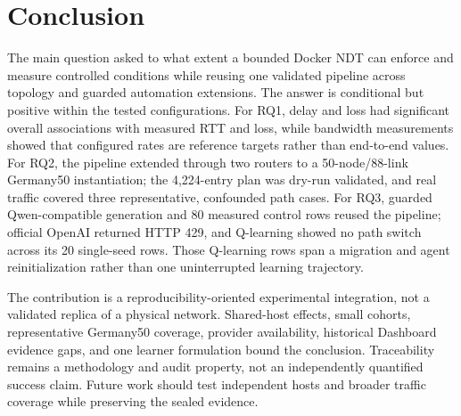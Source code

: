 \section{Conclusion}
\label{sec:conclusion}

The main question asked to what extent a bounded Docker NDT can enforce and measure controlled conditions while reusing one validated pipeline across topology and guarded automation extensions. The answer is conditional but positive within the tested configurations. For RQ1, delay and loss had significant overall associations with measured RTT and loss, while bandwidth measurements showed that configured rates are reference targets rather than end-to-end values. For RQ2, the pipeline extended through two routers to a 50-node/88-link Germany50 instantiation; the 4,224-entry plan was dry-run validated, and real traffic covered three representative, confounded path cases. For RQ3, guarded Qwen-compatible generation and 80 measured control rows reused the pipeline; official OpenAI returned HTTP 429, and Q-learning showed no path switch across its 20 single-seed rows. Those Q-learning rows span a migration and agent reinitialization rather than one uninterrupted learning trajectory.

The contribution is a reproducibility-oriented experimental integration, not a validated replica of a physical network. Shared-host effects, small cohorts, representative Germany50 coverage, provider availability, historical Dashboard evidence gaps, and one learner formulation bound the conclusion. Traceability remains a methodology and audit property, not an independently quantified success claim. Future work should test independent hosts and broader traffic coverage while preserving the sealed evidence.
